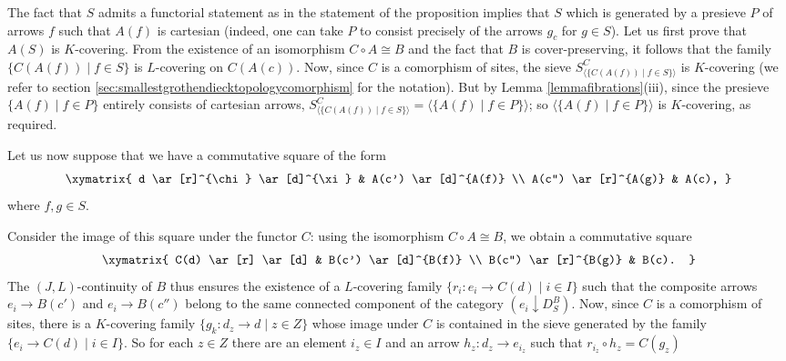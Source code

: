 \documentclass[a4paper,12pt]{article}
\begin{document}
\begin{proofs}
	The fact that $S$ admits a functorial statement as in the statement of the proposition implies that $S$ which is generated by a presieve $P$ of arrows $f$ such that $A(f)$ is cartesian (indeed, one can take $P$ to consist precisely of the arrows $g_{c}$ for $g\in S$). Let us first prove that $A(S)$ is $K$-covering.  From the existence of an isomorphism $C\circ A\cong B$ and the fact that $B$ is cover-preserving, it follows that the family $\{C(A(f))\mid f\in S\}$ is $L$-covering on $C(A(c))$. Now, since $C$ is a comorphism of sites, the sieve $S^{C}_{\langle \{C(A(f))\mid f\in S\}\rangle }$ is $K$-covering (we refer to section \ref{sec:smallestgrothendiecktopologycomorphism} for the notation). But by Lemma \ref{lemmafibrations}(iii), since the presieve $\{A(f) \mid f\in P\}$ entirely consists of cartesian arrows, $S^{C}_{\langle \{C(A(f))\mid f\in S\}\rangle }=\langle \{A(f) \mid f\in P\}\rangle $; so $\langle \{A(f) \mid f\in P\}\rangle $ is $K$-covering, as required.
	
	Let us now suppose that we have a commutative square of the form
		\[
	\xymatrix{
		d \ar[r]^{\chi} \ar[d]^{\xi}  & A(c') \ar[d]^{A(f)} \\
		A(c'') \ar[r]^{A(g)} & A(c),
	} 
	\]
	where $f,g\in S$.
	
	Consider the image of this square under the functor $C$: using the isomorphism $C\circ A\cong B$, we obtain a commutative square
			\[
	\xymatrix{
		C(d) \ar[r] \ar[d]  & B(c') \ar[d]^{B(f)} \\
		B(c'') \ar[r]^{B(g)} & B(c).
	} 
	\]
	The $(J, L)$-continuity of $B$ thus ensures the existence of a $L$-covering family $\{r_{i}:e_{i}\to C(d) \mid i\in I\}$ such that the composite arrows $e_{i}\to B(c')$ and $e_{i}\to B(c'')$ belong to the same connected component of the category $(e_{i} \downarrow D^{B}_{S})$. Now, since $C$ is a comorphism of sites, there is a $K$-covering family $\{g_{k}:d_{z}\to d \mid z\in Z\}$ whose image under $C$ is contained in the sieve generated by the family $\{e_{i}\to C(d) \mid i\in I\}$. So for each $z\in Z$ there are an element $i_{z}\in I$ and an arrow $h_{z}:d_{z}\to e_{i_{z}}$ such that $r_{i_{z}}\circ h_{z}=C(g_{z})$
	

\end{proofs}
\end{document}
